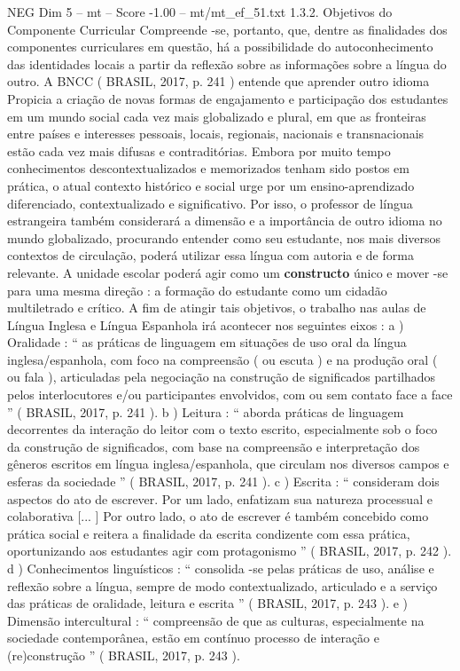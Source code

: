 \begin{textsample}{NEG Dim 5 – mt – Score -1.00 – mt/mt\_ef\_51.txt}  \label{ex:f5_neg_205}
1.3.2.
Objetivos do Componente Curricular Compreende -se, portanto, que, dentre as finalidades dos componentes curriculares em questão, há a possibilidade do autoconhecimento das identidades locais a partir da reflexão sobre as informações sobre a língua do outro.
A BNCC ( BRASIL, 2017, p. 241 ) entende que aprender outro idioma Propicia a criação de novas formas de engajamento e participação dos estudantes em um mundo social cada vez mais globalizado e plural, em que as fronteiras entre países e interesses pessoais, locais, regionais, nacionais e transnacionais estão cada vez mais difusas e contraditórias.
Embora por muito tempo conhecimentos descontextualizados e memorizados tenham sido postos em prática, o atual contexto histórico e social urge por um ensino-aprendizado diferenciado, contextualizado e significativo.
Por isso, o professor de língua estrangeira também considerará a dimensão e a importância de outro idioma no mundo globalizado, procurando entender como seu estudante, nos mais diversos contextos de circulação, poderá utilizar essa língua com autoria e de forma relevante.
A unidade escolar poderá agir como um \textbf{constructo} único e mover -se para uma mesma direção : a formação do estudante como um cidadão multiletrado e crítico.
A fim de atingir tais objetivos, o trabalho nas aulas de Língua Inglesa e Língua Espanhola irá acontecer nos seguintes eixos : a ) Oralidade : “ as práticas de linguagem em situações de uso oral da língua inglesa/espanhola, com foco na compreensão ( ou escuta ) e na produção oral ( ou fala ), articuladas pela negociação na construção de significados partilhados pelos interlocutores e/ou participantes envolvidos, com ou sem contato face a face ” ( BRASIL, 2017, p. 241 ). b ) Leitura : “ aborda práticas de linguagem decorrentes da interação do leitor com o texto escrito, especialmente sob o foco da construção de significados, com base na compreensão e interpretação dos gêneros escritos em língua inglesa/espanhola, que circulam nos diversos campos e esferas da sociedade ” ( BRASIL, 2017, p. 241 ). c ) Escrita : “ consideram dois aspectos do ato de escrever.
Por um lado, enfatizam sua natureza processual e colaborativa [... ] Por outro lado, o ato de escrever é também concebido como prática social e reitera a finalidade da escrita condizente com essa prática, oportunizando aos estudantes agir com protagonismo ” ( BRASIL, 2017, p. 242 ). d ) Conhecimentos linguísticos : “ consolida -se pelas práticas de uso, análise e reflexão sobre a língua, sempre de modo contextualizado, articulado e a serviço das práticas de oralidade, leitura e escrita ” ( BRASIL, 2017, p. 243 ). e ) Dimensão intercultural : “ compreensão de que as culturas, especialmente na sociedade contemporânea, estão em contínuo processo de interação e (re)construção ” ( BRASIL, 2017, p. 243 ).

\end{textsample}
